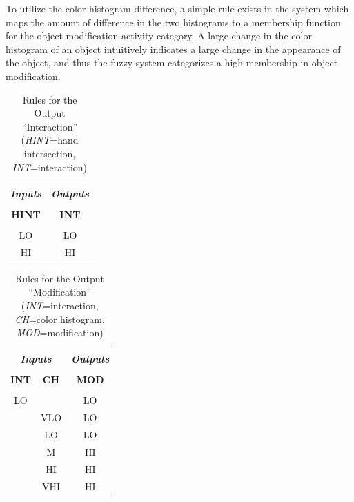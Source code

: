 \documentclass[12pt]{report}
\begin{document}
To utilize the color histogram difference, a simple rule exists in the system which maps the amount of difference in the two histograms to a membership function for the object modification activity category. A large change in the color histogram of an object intuitively indicates a large change in the appearance of the object, and thus the fuzzy system categorizes a high membership in object modification.

\begin{table}
\caption{Rules for the Output ``Interaction'' (\textit{HINT}=hand intersection, \textit{INT}=interaction)}
\begin{center}
\begin{tabular}{cc}
\hline \\
\textbf{\textit{Inputs}}&\textbf{\textit{Outputs}} \\
\hline
\hline \\
\textbf{HINT} & \textbf{INT}\\
\hline \\
 LO & LO \\
 HI & HI \\
\hline
\end{tabular}
\label{interactRules}
\end{center}
\end{table}


\begin{table}
\caption{Rules for the Output ``Modification'' (\textit{INT}=interaction, \textit{CH}=color histogram, \textit{MOD}=modification)}
\begin{center}
\begin{tabular}{ccc}
\hline \\
\multicolumn{2}{c}{\textbf{\textit{Inputs}}}&\textbf{\textit{Outputs}} \\
\hline
\hline \\
\textbf{INT} & \textbf{CH} & \textbf{MOD}\\
\hline \\
LO & & LO \\
 & VLO & LO \\
 & LO & LO \\
 & M & HI \\
 & HI & HI \\
 & VHI & HI \\
\hline
\end{tabular}
\label{modifyRules}
\end{center}
\end{table}
\end{document}
